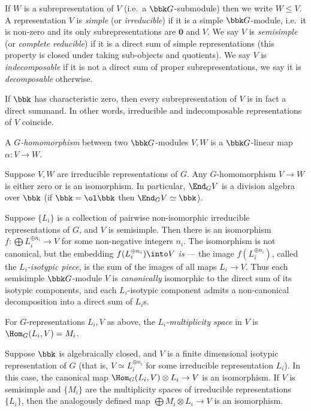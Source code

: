 If $W$ is a subrepresentation of $V$ (i.e.\ a $\bbk G$-submodule) then we write
$W\leq V$. A representation $V$ is \emph{simple} (or \emph{irreducible}) if it
is a simple $\bbk G$-module, i.e.\ it is non-zero and its only
subrepresentations are $\mathbf{0}$ and $V$. We say $V$ is \emph{semisimple} (or
\emph{complete reducible}) if it is a direct sum of simple representations (this
property is closed under taking sub-objects and quotients). We say $V$ is
\emph{indecomposable} if it is not a direct sum of proper subrepresentations, we
say it is \emph{decomposable} otherwise. 

\begin{theorem}[(Maschke)]
    If $\bbk$ has characteristic zero, then every subrepresentation of $V$ is in
    fact a direct summand. In other words, irreducible and indecomposable
    representations of $V$ coincide.
\end{theorem}

A \emph{$G$-homomorphism} between two $\bbk G$-modules $V,W$ is a $\bbk G$-linear
map $\alpha\colon V\to W$.

\begin{theorem}
    Suppose $V,W$ are irreducible representations of $G$. Any $G$-homomorphism
    $V\to W$ is either zero or is an isomorphism. In particular, $\End_GV$ is
    a division algebra over $\bbk$ (if $\bbk=\ol\bbk$ then $\End_GV\simeq \bbk$).
\end{theorem}

Suppose $\{L_i\}$ is a collection of pairwise non-isomorphic irreducible
representations of $G$, and $V$ is semisimple. Then there is an isomorphism
$f\colon \bigoplus L_i ^{\oplus n_i}\to V$ for some non-negative integers $n_i$. The
isomorphism is not canonical, but the embedding $f(L_i^{\oplus n_i})\into V$
\emph{is} --- the image $f(L_i^{\oplus n_i})$, called the \emph{$L_i$-isotypic
piece}, is the sum of the images of all maps $L_i\to V$. Thus each semisimple $\bbk
G$-module $V$ is \emph{canonically} isomorphic to the direct sum of its isotypic
components, and each $L_i$-isotypic component admits a non-canonical
decomposition into a direct sum of $L_i$s.

\begin{definition}
    For $G$-representations $L_i, V$ as above, the \emph{$L_i$-multiplicity space} in $V$ is $\Hom_G(L_i, V)=M_i$.
\end{definition}

Suppose $\bbk$ is algebraically closed, and $V$ is a finite dimensional
isotypic representation of $G$ (that is, $V\simeq L_i^{\oplus n_i}$ for some
irreducible representation $L_i$). In this case, the canonical map $\Hom_G(L_i,
V)\otimes L_i\to V$ is an isomorphism. If $V$ is semisimple and $\{M_i\}$ are the
multiplicity spaces of irreducible representations $\{L_i\}$, then the
analogously defined map $\bigoplus M_i\otimes L_i \to V$ is an isomorphism. 


